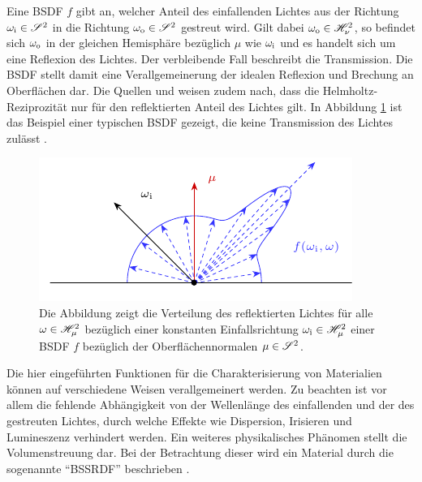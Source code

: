 		Eine BSDF $f$ gibt an, welcher Anteil des einfallenden Lichtes aus der Richtung $\omega_{\mathrm{i}}\in\mathscr{S}^{2}$ in die Richtung $\omega_{\mathrm{o}}\in\mathscr{S}^{2}$ gestreut wird.
		Gilt dabei $\omega_{\mathrm{o}}\in\mathscr{H}^{2}_{\nu}$, so befindet sich $\omega_{\mathrm{o}}$ in der gleichen Hemisphäre bezüglich $\mu$ wie $\omega_{\mathrm{i}}$ und es handelt sich um eine Reflexion des Lichtes.
		Der verbleibende Fall beschreibt die Transmission.
		Die BSDF stellt damit eine Verallgemeinerung der idealen Reflexion und Brechung an Oberflächen dar.
		Die Quellen \cite[S.~571~ff]{pbrt3} und \cite[S.~135~ff]{veach-thesis} weisen zudem nach, dass die Helmholtz-Reziprozität nur für den reflektierten Anteil des Lichtes gilt.
		In Abbildung \ref{fig:brdf} ist das Beispiel einer typischen BSDF gezeigt, die keine Transmission des Lichtes zulässt \cite[S.~509~ff]{pbrt3}.

		\begin{figure}
			\center
			\includegraphics{gg_fig/brdf_1.pdf}
			\caption[Schema einer BSDF]{Die Abbildung zeigt die Verteilung des reflektierten Lichtes für alle $\omega\in\mathscr{H}^{2}_{\mu}$ bezüglich einer konstanten Einfallsrichtung $\omega_{\mathrm{i}}\in\mathscr{H}^{2}_{\mu}$ einer BSDF $f$ bezüglich der Oberflächennormalen $\mu\in\mathscr{S}^{2}$.}
			\label{fig:brdf}
		\end{figure}

		Die hier eingeführten Funktionen für die Charakterisierung von Materialien können auf verschiedene Weisen verallgemeinert werden.
		Zu beachten ist vor allem die fehlende Abhängigkeit von der Wellenlänge des einfallenden und der des gestreuten Lichtes, durch welche Effekte wie Dispersion, Irisieren und Lumineszenz verhindert werden.
		Ein weiteres physikalisches Phänomen stellt die Volumenstreuung dar.
		Bei der Betrachtung dieser wird ein Material durch die sogenannte \enquote{BSSRDF} beschrieben \cite[S.~671~ff]{pbrt3}.

